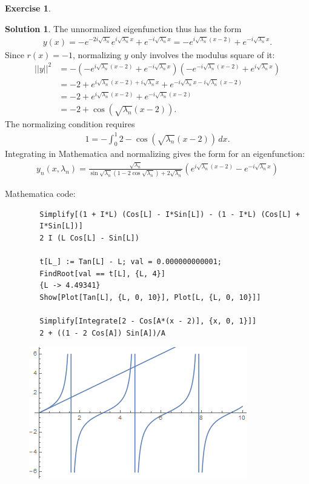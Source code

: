 \documentclass{book}
\theoremstyle{definition}
\newtheorem*{exer*}{Exercise}
\newtheorem*{sln*}{Solution}
\begin{document}
\begin{exer*}
\begin{enumerate}
\begin{sln*}
			The unnormalized eigenfunction thus has the form 
			\begin{align*}
			y(x) = -e^{-2i\sqrt{\lambda_n}}e^{i\sqrt{\lambda_n}x} + e^{-i\sqrt{\lambda_n}x} = -e^{i\sqrt{\lambda_n}(x-2)} + e^{-i\sqrt{\lambda_n}x} .
			\end{align*}	
			Since $r(x) = -1$, normalizing $y$ only involves the modulus square of it:
			\begin{align*}
			\vert\vert y \vert\vert^2 &= -(-e^{i\sqrt{\lambda_n}(x-2)} + e^{-i\sqrt{\lambda_n}x})(-e^{-i\sqrt{\lambda_n}(x-2)} + e^{i\sqrt{\lambda_n}x})\\
			&= -2 + e^{i\sqrt{\lambda_n}(x-2) + i\sqrt{\lambda_n}x} + e^{-i\sqrt{\lambda_n}x  -i\sqrt{\lambda_n}(x-2) }\\
			&= -2 + e^{i\sqrt{\lambda_n}(x-2)} + e^{-i\sqrt{\lambda_n}(x-2)}\\
			&= -2 + \cos\left(\sqrt{\lambda_n} (x-2)\right).
			\end{align*}
			The normalizing condition requires 
			\begin{align*}
			1 = -\int^1_0 2 - \cos\left(\sqrt{\lambda_n} (x-2)\right)\,dx.
			\end{align*}
			Integrating in Mathematica and normalizing gives the form for an eigenfunction:
			\begin{align*}
			\boxed{y_n(x,\lambda_n) =  \frac{\sqrt{\lambda_n}}{\sin\sqrt{\lambda_n} (1- 2 \cos\sqrt{\lambda_n})+2\sqrt{\lambda_n}}\left( e^{i\sqrt{\lambda_n}(x-2)} - e^{-i\sqrt{\lambda_n}x}  \right)}
			\end{align*}
		\end{sln*}
		
		Mathematica code:
		\begin{lstlisting}
		Simplify[(1 + I*L) (Cos[L] - I*Sin[L]) - (1 - I*L) (Cos[L] + 
		I*Sin[L])]
		2 I (L Cos[L] - Sin[L])
		
		t[L_] := Tan[L] - L; val = 0.000000000001; 
		FindRoot[val == t[L], {L, 4}]
		{L -> 4.49341}
		Show[Plot[Tan[L], {L, 0, 10}], Plot[L, {L, 0, 10}]]
		
		Simplify[Integrate[2 - Cos[A*(x - 2)], {x, 0, 1}]]
		2 + ((1 - 2 Cos[A]) Sin[A])/A
		\end{lstlisting}
		
		\begin{figure}[h!]
			\centering
			\includegraphics[scale=0.7]{pde_3_1.png}
		\end{figure}
		

\end{enumerate}
\end{exer*}
\end{document}
